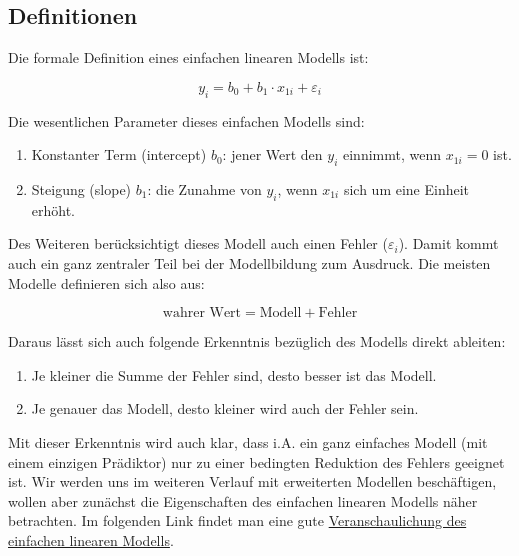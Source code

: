 \documentclass[]{article}
\providecommand{\tightlist}{%
  \setlength{\itemsep}{0pt}\setlength{\parskip}{0pt}}
\begin{document}
\subsection*{Definitionen}\label{definitionen}

Die formale Definition eines einfachen linearen Modells ist:

\begin{equation} 
  y_i = b_0 + b_1 \cdot x_{1i} + \varepsilon_i
  \label{eq:LinModFehler}
\end{equation}

Die wesentlichen Parameter dieses einfachen Modells sind:

\begin{enumerate}
\def\labelenumi{\arabic{enumi}.}
\tightlist
\item
  Konstanter Term (intercept) \(b_0\): jener Wert den \(y_i\) einnimmt,
  wenn \(x_{1i} = 0\) ist.
\item
  Steigung (slope) \(b_1\): die Zunahme von \(y_i\), wenn \(x_{1i}\)
  sich um eine Einheit erhöht.
\end{enumerate}

Des Weiteren berücksichtigt dieses Modell auch einen Fehler
(\(\varepsilon_i\)). Damit kommt auch ein ganz zentraler Teil bei der
Modellbildung zum Ausdruck. Die meisten Modelle definieren sich also
aus:

\begin{equation} 
  \textrm{wahrer Wert} = \textrm{Modell} + \textrm{Fehler}
  \label{eq:AllgModellvorstellung}
\end{equation}

Daraus lässt sich auch folgende Erkenntnis bezüglich des Modells direkt
ableiten:

\begin{enumerate}
\def\labelenumi{\arabic{enumi}.}
\tightlist
\item
  Je kleiner die Summe der Fehler sind, desto besser ist das Modell.
\item
  Je genauer das Modell, desto kleiner wird auch der Fehler sein.
\end{enumerate}

Mit dieser Erkenntnis wird auch klar, dass i.A. ein ganz einfaches
Modell (mit einem einzigen Prädiktor) nur zu einer bedingten Reduktion
des Fehlers geeignet ist. Wir werden uns im weiteren Verlauf mit
erweiterten Modellen beschäftigen, wollen aber zunächst die
Eigenschaften des einfachen linearen Modells näher betrachten. Im
folgenden Link findet man eine gute
\href{https://phet.colorado.edu/sims/html/least-squares-regression/latest/least-squares-regression_en.html}{Veranschaulichung
des einfachen linearen Modells}.
\end{document}
